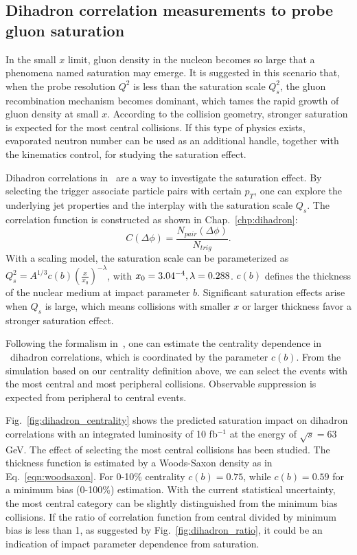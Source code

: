 \subsection{Dihadron correlation measurements to probe gluon saturation}

In the small $x$ limit, gluon density in the nucleon becomes so large that a
phenomena named saturation may emerge. It is suggested in this scenario that, when the probe
resolution $Q^{2}$ is less than the saturation scale $Q^{2}_{s}$, the gluon
recombination mechanism becomes dominant, which tames the rapid growth of
gluon density at small $x$. According to the collision
geometry, stronger saturation is expected for the most central collisions. If
this type of physics exists, evaporated neutron number can be used as an
additional handle, together with the kinematics control, for studying the saturation effect.

Dihadron correlations in \eA\ are a way to investigate the saturation effect. By
selecting the trigger associate particle pairs with certain $p_{T}$, one can
explore the underlying jet properties and the interplay with the saturation
scale $Q_{s}$. The correlation function is constructed as shown in Chap.~\ref{chp:dihadron}:
\begin{equation}
C(\Delta\phi)=\frac{N_{pair}(\Delta\phi)}{N_{trig}}.
\end{equation}
With a scaling model, the saturation scale can be parameterized as
$Q_{s}^{2}=A^{1/3} c(b)(\frac{x}{x_{0}})^{-\lambda}$, with $x_{0}=3.04\time
10^{-4}, \lambda = 0.288$. $c(b)$ defines the thickness of the nuclear medium at
impact parameter $b$. Significant saturation effects arise when $Q_{s}$ is
large, which means collisions with smaller $x$ or larger thickness favor a
stronger saturation effect.

Following the formalism in~\cite{Zheng:2014vka}, one can estimate the centrality
dependence in \eA\ dihadron correlations, which is coordinated by the parameter $c(b)$.
From the simulation based on our centrality definition above, we can select the
events with the most central and most peripheral collisions. Observable suppression
is expected from peripheral to central events.

Fig.~\ref{fig:dihadron_centrality} shows the predicted saturation impact on dihadron correlations with an integrated luminosity of 10 fb$^{-1}$ at the energy of $\sqrt{s}=63$ GeV.
The effect of selecting the most central collisions has been studied. The thickness function is estimated by
a Woods-Saxon density as in Eq.~\ref{eqn:woodsaxon}. For 0-10\% centrality $c(b)=0.75$, while $c(b)=0.59$
for a minimum bias (0-100\%) estimation. With the current statistical uncertainty, the most central category can be slightly distinguished from the minimum bias collisions. If the ratio of correlation function from central divided by minimum bias is less than 1, as suggested by Fig.~\ref{fig:dihadron_ratio}, it could be an indication of impact parameter dependence from saturation.


